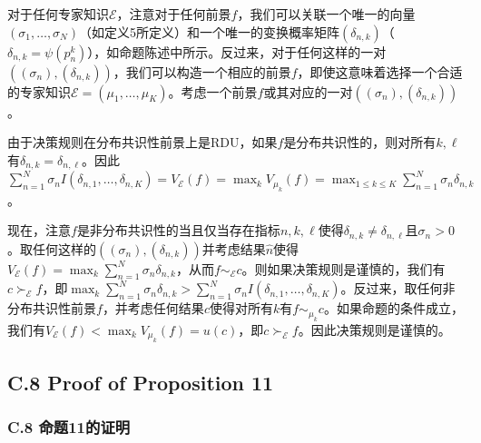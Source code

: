 \documentclass[12pt,a4paper]{article}
\newenvironment{translation}
  {\par\noindent{\color{transblue}\ignorespaces}}
  {\par\medskip}
\begin{document}
\begin{translation}
对于任何专家知识$\mathcal{E}$，注意对于任何前景$f$，我们可以关联一个唯一的向量$(\sigma_{1}, \dots, \sigma_{N})$（如定义5所定义）和一个唯一的变换概率矩阵$(\delta_{n,k})$（$\delta_{n,k} = \psi(p^{k}_{n})$），如命题陈述中所示。反过来，对于任何这样的一对$((\sigma_{n}), (\delta_{n,k}))$，我们可以构造一个相应的前景$f$，即使这意味着选择一个合适的专家知识$\mathcal{E} = (\mu_{1}, \dots, \mu_{K})$。考虑一个前景$f$或其对应的一对$((\sigma_{n}), (\delta_{n,k}))$。

由于决策规则在分布共识性前景上是RDU，如果$f$是分布共识性的，则对所有$k,\ell$有$\delta_{n,k} = \delta_{n,\ell}$。因此$\sum_{n=1}^{N} \sigma_{n} I(\delta_{n,1}, \dots, \delta_{n,K}) = V_{\mathcal{E}}(f) = \max_{k} V_{\mu_{k}}(f) = \max_{1 \leq k \leq K} \sum_{n=1}^{N} \sigma_{n} \delta_{n,k}$。

现在，注意$f$是非分布共识性的当且仅当存在指标$n, k, \ell$使得$\delta_{n,k} \neq \delta_{n,\ell}$且$\sigma_{n} > 0$。取任何这样的$((\sigma_{n}), (\delta_{n,k}))$并考虑结果$\hat{n}$使得$V_{\mathcal{E}}(f) = \max_{k} \sum_{n=1}^{N} \sigma_{n} \delta_{n,k}$，从而$f \sim_{\mathcal{E}} c$。则如果决策规则是谨慎的，我们有$c \succ_{\mathcal{E}} f$，即$\max_{k} \sum_{n=1}^{N} \sigma_{n} \delta_{n,k} > \sum_{n=1}^{N} \sigma_{n} I(\delta_{n,1}, \dots, \delta_{n,K})$。反过来，取任何非分布共识性前景$f$，并考虑任何结果$c$使得对所有$k$有$f \sim_{\mu_{k}} c$。如果命题的条件成立，我们有$V_{\mathcal{E}}(f) < \max_{k} V_{\mu_{k}}(f) = u(c)$，即$c \succ_{\mathcal{E}} f$。因此决策规则是谨慎的。
\end{translation}

\subsection*{C.8 Proof of Proposition 11}
{\color{transblue}\subsubsection*{C.8 命题11的证明}}
\end{document}
